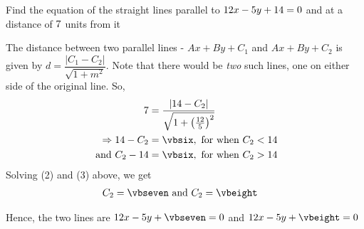 \question Find the equation of the straight lines parallel to $12 x - 5 y + 14 = 0$ 
and at a distance of $7$ units from it

\insertQR[-15pt]{}

\watchout

\ifprintanswers
\fi 

\begin{solution}
	The distance between two parallel lines - $Ax + By + C_1$ and $Ax+By+C_2$ is given by 
	$d = \dfrac{\vert C_1 - C_2 \vert}{\sqrt{1 + m^2}}$. Note that there would be \textit{two} such lines, 
	one on either side of the original line. So,
	\begin{align}
		\vbfour &= \dfrac{\vert \vbthree - C_2 \vert}{\sqrt{1 + \left( \frac{\vbone}{\vbtwo}\right)^2}} \\
		\Rightarrow \vbthree - C_2 &= \vbsix, \text{ for when } C_2 < \vbthree \\
		\text{ and } C_2 - \vbthree &= \vbsix, \text{ for when } C_2 > \vbthree
	\end{align}
	Solving (2) and (3) above, we get 
	\begin{align}
		C_2 &= \vbseven \text{ and } C_2 = \vbeight
	\end{align}
	
	Hence, the two lines are $\vbone x - \vbtwo y + \vbseven = 0$ and $\vbone x - \vbtwo y + \vbeight = 0$
\end{solution}
